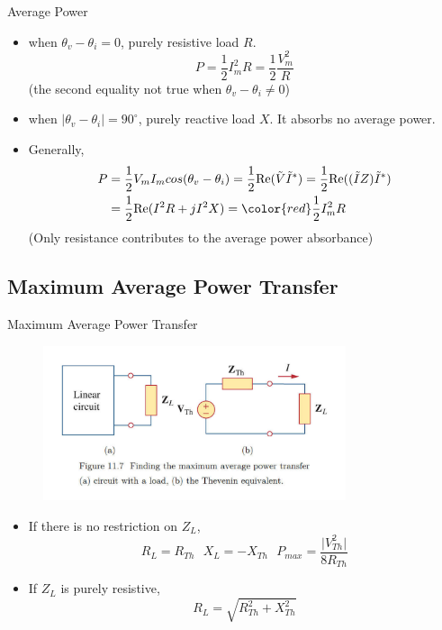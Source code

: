 \documentclass{beamer}
\begin{document}
\begin{frame}{Average Power}

\begin{itemize}
    \item when $\theta_{v}-\theta_{i}=0$, purely resistive load $R$.
    $$P = \frac12I_m^2R=\frac12\frac{V_m^2}{R}$$
    (the second equality not true when $\theta_{v}-\theta_{i}\neq 0$)
    
    \item when $\lvert \theta_{v}-\theta_{i} \rvert = 90^{\circ}$, purely reactive load $X$. It absorbs no \textcolor[rgb]{1,0,0}{average} power.
    \item Generally,
    $$\begin{aligned}
        P &= \dfrac{1}{2}V_{m}I_{m} cos(\theta_{v}-\theta_{i}) = \dfrac{1}{2}\mathrm{Re}(\tilde{V} \tilde{I}^{*})= \dfrac{1}{2} \mathrm{Re}((\tilde{I}Z)\tilde{I}^{*})\\
        & = \frac12\mathrm{Re}(I^2R+jI^2X)= \color{red}\dfrac{1}{2} I_{m}^{2}R
    \end{aligned}$$
    (Only resistance contributes to the average power absorbance)
\end{itemize}

\end{frame}

\subsection{Maximum Average Power Transfer}

\begin{frame}{Maximum Average Power Transfer}
\begin{figure}
\centering
\includegraphics[width=3.5in]{img_ch11/maximum_power.png}
\end{figure}
\begin{itemize}
\item If there is no restriction on $Z_L$,
$$R_{L}=R_{Th}\ \ \ X_{L}=-X_{Th}\ \ \ P_{max}=\dfrac{\lvert V_{Th }^{2} \rvert}{8R_{Th}}$$
\item If $Z_L$ is purely resistive,
$$R_{L}=\sqrt{R_{Th}^{2}+X_{Th}^{2}}$$
\end{itemize}
\end{frame}
\end{document}
